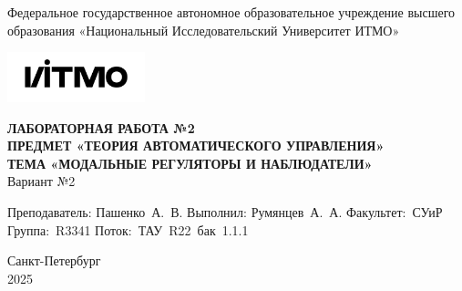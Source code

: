 \documentclass[a4paper, 12pt]{article}
\begin{document}
    \begin{titlepage}

        \begin{center}
        Федеральное государственное автономное образовательное учреждение высшего образования
        «Национальный Исследовательский Университет ИТМО»
        \vfill
        
        \includegraphics[width=0.3\textwidth]{itmo.png} %

        {\large\bf ЛАБОРАТОРНАЯ РАБОТА №2}\\
        {\large\bf ПРЕДМЕТ «ТЕОРИЯ АВТОМАТИЧЕСКОГО УПРАВЛЕНИЯ»}\\
        {\large\bf ТЕМА «МОДАЛЬНЫЕ РЕГУЛЯТОРЫ И НАБЛЮДАТЕЛИ»}\\
        Вариант №2
        \vfill

        \begin{flushright}
            \begin{minipage}{.45\textwidth}
            {
                \hbox{Преподаватель:}
                \hbox{Пашенко А. В.}
                \hbox{}
                \hbox{Выполнил:}
                \hbox{Румянцев А. А.}
                \hbox{}
                \hbox{Факультет: СУиР}
                \hbox{Группа: R3341}
                \hbox{Поток: ТАУ R22 бак 1.1.1}
            }
            \end{minipage}
        \end{flushright}
        \vfill
  
        Санкт-Петербург\\
        2025
        \end{center}
    \end{titlepage}
    
    \tableofcontents

    \newpage
\end{document}
